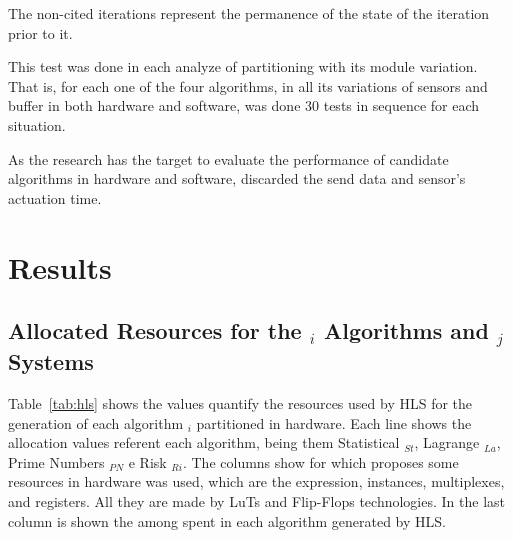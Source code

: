         The non-cited iterations represent the permanence of the state of the iteration prior to it.
   
        This test was done in each analyze of partitioning with its module variation.
        That is, for each one of the four algorithms, in all its variations of sensors and buffer in both hardware and software, was done 30 tests in sequence for each situation.
        
        As the research has the target to evaluate the performance of candidate algorithms in hardware and software, discarded the send data and sensor's actuation time.
        
        
\section{Results}   \label{chap:results}
    
    \subsection{Allocated Resources for the \A$_{i}$ Algorithms and \Ss$_{j}$ Systems}
        
        Table~\ref{tab:hls} shows the values quantify the resources used by HLS for the generation of each algorithm \A$ _i $ partitioned in hardware.
        Each line shows the allocation values referent each algorithm, being them Statistical \A$_{St}$, Lagrange \A$_{La}$, Prime Numbers \A$_{PN}$ e Risk \A$_{Ri}$.
        The columns show for which proposes some resources in hardware was used, which are the expression, instances, multiplexes, and registers.
        All they are made by LuTs and Flip-Flops technologies.
        In the last column is shown the among spent in each algorithm generated by HLS.
        
